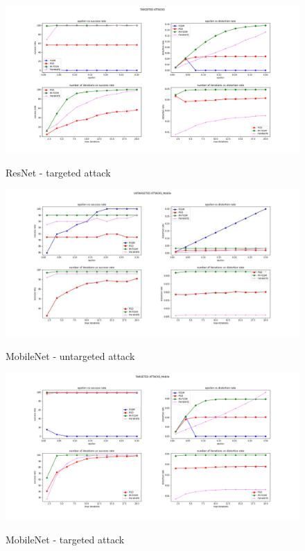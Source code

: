 \documentclass[10pt,twocolumn,letterpaper, english]{article}
\theoremstyle{definition}
\theoremstyle{plain}
\theoremstyle{plain}
\theoremstyle{plain}
\theoremstyle{plain}
\theoremstyle{remark}
\theoremstyle{remark}
\theoremstyle{definition}
\theoremstyle{definition}
\theoremstyle{definition}
\theoremstyle{definition}
\begin{document}
\begin{figure}[ht]
  \centering
  \includegraphics[width=\textwidth]{./Images/ResNet-targeted_grid.pdf}\\
  \caption{ResNet - targeted attack } \label{res-t}
\end{figure}

\begin{figure}[ht]
  \centering
  \includegraphics[width=\textwidth]{./Images/MobileNet-Untargeted.jpeg}\\
  \caption{MobileNet - untargeted attack } \label{mob-unt}
\end{figure}

\begin{figure}[ht]
  \centering
  \includegraphics[width=\textwidth]{./Images/Mobile_Grid_Targeted.png}\\
  \caption{MobileNet - targeted attack } \label{mob-t}
\end{figure}




\end{document}

